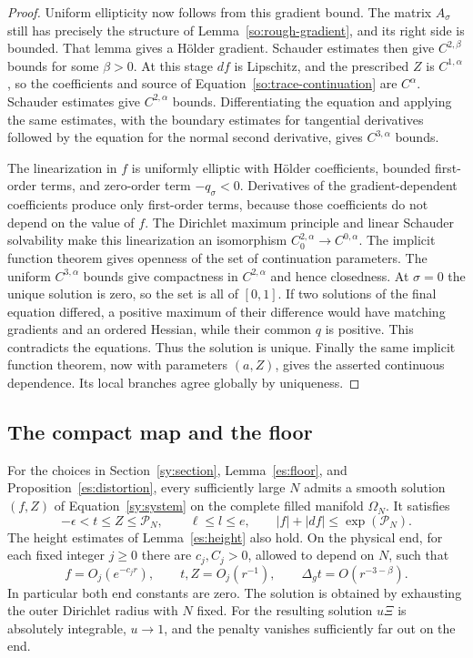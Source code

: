 \begin{proof}
Uniform ellipticity now follows from this gradient bound.  The matrix
$A_\sigma$ still has precisely the structure of
Lemma~\ref{so:rough-gradient}, and its right side is bounded.  That
lemma gives a H\"older gradient.  Schauder estimates then give
$C^{2,\beta}$ bounds for some $\beta>0$.  At this stage $df$ is
Lipschitz, and the prescribed $Z$ is $C^{1,\alpha}$, so the coefficients
and source of Equation~\ref{so:trace-continuation} are $C^\alpha$.
Schauder estimates give $C^{2,\alpha}$ bounds.  Differentiating the
equation and applying the same estimates, with the boundary estimates
for tangential derivatives followed by the equation for the normal
second derivative, gives $C^{3,\alpha}$ bounds.

The linearization in $f$ is uniformly elliptic with H\"older
coefficients, bounded first-order terms, and zero-order term
$-q_\sigma<0$.  Derivatives of the gradient-dependent coefficients
produce only first-order terms, because those coefficients do not
depend on the value of $f$.  The Dirichlet maximum principle and linear
Schauder solvability make this linearization an isomorphism
$C^{2,\alpha}_0\to C^{0,\alpha}$.  The implicit function theorem gives
openness of the set of continuation parameters.  The uniform
$C^{3,\alpha}$ bounds give compactness in $C^{2,\alpha}$ and hence
closedness.  At $\sigma=0$ the unique solution is zero, so the set is
all of $[0,1]$.
If two solutions of the final equation differed, a positive maximum
of their difference would have matching gradients and an ordered
Hessian, while their common $q$ is positive.
This contradicts the equations.  Thus the solution is unique.
Finally the same implicit function theorem, now with parameters
$(a,Z)$, gives the asserted continuous dependence.  Its local branches
agree globally by uniqueness.
\end{proof}

\subsection{The compact map and the floor}

\begin{theorem}\label{so:filled-solver}
For the choices in Section~\ref{sy:section},
Lemma~\ref{es:floor}, and Proposition~\ref{es:distortion}, every sufficiently
large $N$ admits a smooth solution $(f,Z)$ of Equation~\ref{sy:system}
on the complete filled manifold $\Omega_N$.  It satisfies
\[
 -\epsilon<t\le Z\le\mathcal P_N,\qquad
 \ell\le l\le e,\qquad |f|+|df|\le\exp(\mathcal P_N).
\]
The height estimates of Lemma~\ref{es:height} also hold.  On the physical
end, for each fixed integer $j\ge0$ there are $c_j,C_j>0$, allowed to
depend on $N$, such that
\begin{equation}\label{so:physical-end}
 f=O_j(e^{-c_jr}),\qquad
 t,Z=O_j(r^{-1}),\qquad
 \Delta_g t=O(r^{-3-\beta}).
\end{equation}
In particular both end constants are zero.  The solution is obtained
by exhausting the outer Dirichlet radius with $N$ fixed.  For the
resulting solution $u\Xi$ is absolutely integrable, $u\to1$, and the
penalty vanishes sufficiently far out on the end.
\end{theorem}

